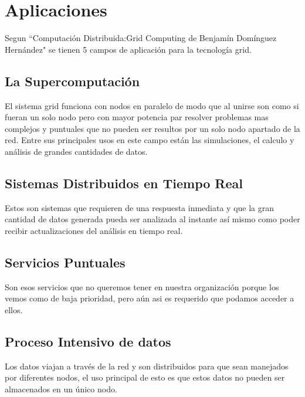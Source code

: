 \documentclass[12pt]{article}
\begin{document}
{\newpage
{\raggedright
\section{Aplicaciones}
Segun ``Computaci\'on Distribuida:Grid Computing de Benjam\'in Dom\'inguez Hern\'andez" se tienen 5 campos de aplicaci\'on para la tecnolog\'ia grid.
\\
\subsection{La Supercomputaci\'on}
El sistema grid funciona con nodos en paralelo de modo que al unirse son como si fueran un solo nodo pero con mayor potencia par resolver problemas mas complejos y puntuales que no pueden ser resultos por un solo nodo apartado de la red.
Entre sus principales usos en este campo est\'an las simulaciones, el calculo y an\'alisis de grandes cantidades de datos.
\subsection{Sistemas Distribuidos en Tiempo Real}
Estos son sistemas que requieren de una respuesta inmediata y que la gran cantidad de datos generada pueda ser analizada al instante as\'i mismo como poder recibir actualizaciones del an\'alisis en tiempo real.
\subsection{Servicios Puntuales}
Son esos servicios que no queremos tener en nuestra organizaci\'on porque los vemos como de baja prioridad, pero a\'un asi es requerido que podamos acceder a ellos.
\subsection{Proceso Intensivo de datos}
Los datos viajan a trav\'es de la red y son distribuidos para que sean manejados por diferentes nodos, el uso principal de esto es que estos datos no pueden ser almacenados en un \'unico nodo.
}}
\end{document}
